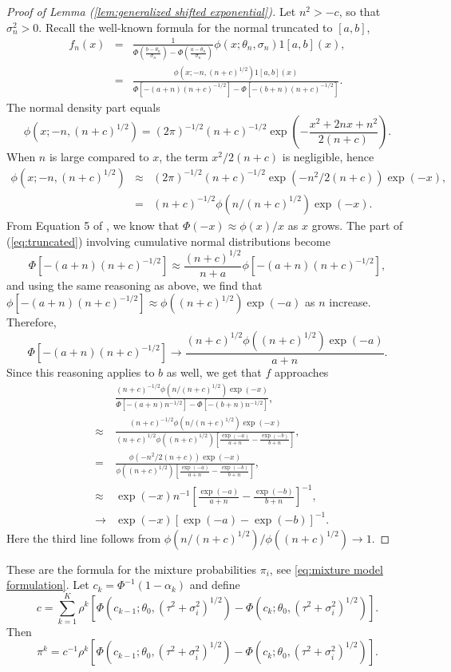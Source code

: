 \documentclass[article]{ajs}
\numberwithin{equation}{section}
\numberwithin{figure}{section}
\theoremstyle{plain}
\theoremstyle{definition}
\theoremstyle{definition}
\theoremstyle{plain}
\begin{document}
\begin{proof}[Proof of Lemma (\ref{lem:generalized shifted exponential})]
\label{proof:generalized shifted exponential}Let $n^{2}>-c$, so
that $\sigma_{n}^{2}>0$. Recall the well-known formula for the normal
truncated to $[a,b]$,
\begin{eqnarray}
f_{n}(x) & = & \frac{1}{\Phi\left(\frac{b-\theta_{n}}{\sigma_{n}}\right)-\Phi\left(\frac{a-\theta_{n}}{\sigma_{n}}\right)}\phi(x;\theta_{n},\sigma_{n})1[a,b](x),\label{eq:truncated}\\
 & = & \frac{\phi(x;-n,(n+c)^{1/2})1[a,b](x)}{\Phi[-(a+n)(n+c)^{-1/2}]-\Phi[-(b+n)(n+c)^{-1/2}]}.\nonumber 
\end{eqnarray}
The normal density part equals
\[
\phi(x;-n,(n+c)^{1/2})=(2\pi)^{-1/2}(n+c)^{-1/2}\exp\left(-\frac{x^{2}+2nx+n^{2}}{2(n+c)}\right).
\]
When $n$ is large compared to $x$, the term $x^{2}/2(n+c)$ is negligible,
hence
\begin{eqnarray*}
\phi(x;-n,(n+c)^{1/2}) & \approx & (2\pi)^{-1/2}(n+c)^{-1/2}\exp(-n^{2}/2(n+c))\exp(-x),\\
 & = & (n+c)^{-1/2}\phi(n/(n+c)^{1/2})\exp(-x).
\end{eqnarray*}
From Equation 5 of \citet{borjesson1979simple}, we know that $\Phi(-x)\approx\phi(x)/x$
as $x$ grows. The part of (\ref{eq:truncated}) involving cumulative
normal distributions become
\begin{equation*}
\Phi[-(a+n)(n+c)^{-1/2}] \approx \frac{(n+c)^{1/2}}{n+a}\phi[-(a+n)(n+c)^{-1/2}],
\end{equation*}
and using the same reasoning as above, we find that $\phi[-(a+n)(n+c)^{-1/2}]\approx\phi((n+c)^{1/2})\exp(-a)$
as $n$ increase. Therefore,
\[
\Phi[-(a+n)(n+c)^{-1/2}]\to\frac{(n+c)^{1/2}\phi((n+c)^{1/2})\exp(-a)}{a+n}.
\]
Since this reasoning applies to $b$ as well, we get that $f$ approaches
\begin{eqnarray*}
 &  & \frac{(n+c)^{-1/2}\phi(n/(n+c)^{1/2})\exp(-x)}{\Phi[-(a+n)n^{-1/2}]-\Phi[-(b+n)n^{-1/2}]},\\
 & \approx & \frac{(n+c)^{-1/2}\phi(n/(n+c)^{1/2})\exp(-x)}{(n+c)^{1/2}\phi((n+c)^{1/2})\left[\frac{\exp(-a)}{a+n}-\frac{\exp(-b)}{b+n}\right]},\\
 & = & \frac{\phi(-n^{2}/2(n+c))\exp(-x)}{\phi((n+c)^{1/2})\left[\frac{\exp(-a)}{a+n}-\frac{\exp(-b)}{b+n}\right]},\\
 & \approx & \exp(-x)n^{-1}\left[\frac{\exp(-a)}{a+n}-\frac{\exp(-b)}{b+n}\right]^{-1},\\
 & \to & \exp(-x)\left[\exp(-a)-\exp(-b)\right]^{-1}.
\end{eqnarray*}
Here the third line follows from $\phi(n/(n+c)^{1/2})/\phi((n+c)^{1/2})\to1$.
\end{proof}
These are the formula for the mixture probabilities
$\pi_{i}$, see \eqref{eq:mixture model formulation}. Let $c_{k}=\Phi^{-1}(1-\alpha_{k})$ and define 
\[
c=\sum_{k=1}^{K}\rho^{k}[\Phi(c_{k-1};\theta_{0},(\tau^{2}+\sigma_{i}^{2})^{1/2})-\Phi(c_{k};\theta_{0},(\tau^{2}+\sigma_{i}^{2})^{1/2})].
\]
Then \label{eq:pi_i formula}
\[
\pi^{k}=c^{-1}\rho^{k}[\Phi(c_{k-1};\theta_{0},(\tau^{2}+\sigma_{i}^{2})^{1/2})-\Phi(c_{k};\theta_{0},(\tau^{2}+\sigma_{i}^{2})^{1/2})].
\]


\end{document}
